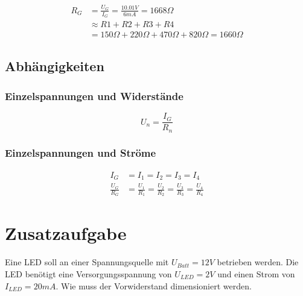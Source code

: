 \documentclass[
a4paper,     %
12pt         %
]{scrartcl}  %
\begin{document}
\begin{align}
R_{G} & =\frac{U_{G}}{I_{G}} = \frac{10.01V}{6mA} =  1668 \Omega \nonumber \\
      & \approx R{1}+R{2}+R{3}+R{4} \nonumber \\
      & = 150\Omega + 220\Omega + 470\Omega + 820\Omega = 1660\Omega \nonumber 
\end{align}




\subsection{Abhängigkeiten}
\subsubsection{Einzelspannungen und Widerstände}
\[U_n = \frac{I_G}{R_n}\]
\subsubsection{Einzelspannungen und Ströme}
\begin{align}
I_G & = I_1 = I_2 = I_3 = I_4 \nonumber \\
\frac{U_G}{R_G} & =\frac{U_1}{R_1}=\frac{U_2}{R_2}=\frac{U_3}{R_3}=\frac{U_4}{R_4} \nonumber
\end{align}

\section{Zusatzaufgabe}
Eine LED soll an einer Spannungsquelle mit $U_{Batt}=12V$ betrieben werden. Die LED benötigt eine Versorgungsspannung von $U_{LED}=2V$ und einen Strom von $I_{LED}=20mA$. Wie muss der Vorwiderstand dimensioniert werden.
\end{document}
